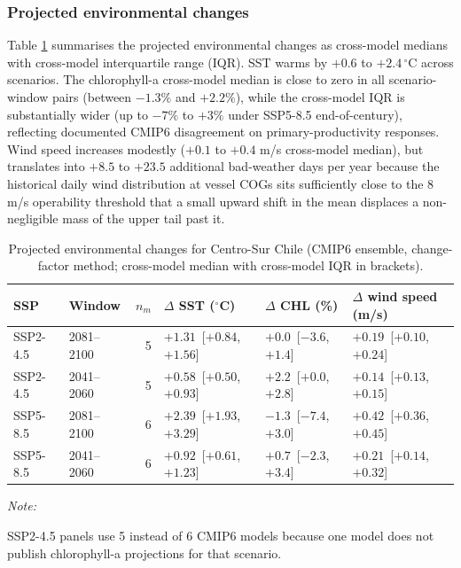\documentclass[
  11pt,
]{article}
\begin{document}
\subsubsection{Projected environmental changes}\label{projected-environmental-changes}

Table \ref{tab:env_projections} summarises the projected environmental changes as cross-model medians with cross-model interquartile range (IQR). SST warms by \(+0.6\) to \(+2.4\,^{\circ}\)C across scenarios. The chlorophyll-a cross-model median is close to zero in all scenario-window pairs (between \(-1.3\%\) and \(+2.2\%\)), while the cross-model IQR is substantially wider (up to \(-7\%\) to \(+3\%\) under SSP5-8.5 end-of-century), reflecting documented CMIP6 disagreement on primary-productivity responses. Wind speed increases modestly (\(+0.1\) to \(+0.4\) m/s cross-model median), but translates into \(+8.5\) to \(+23.5\) additional bad-weather days per year because the historical daily wind distribution at vessel COGs sits sufficiently close to the 8 m/s operability threshold that a small upward shift in the mean displaces a non-negligible mass of the upper tail past it.

\begin{table}[!h]
\centering
\caption{\label{tab:envprojections}Projected environmental changes for Centro-Sur Chile (CMIP6 ensemble, change-factor method; cross-model median with cross-model IQR in brackets). \label{tab:env_projections}}
\centering
\begin{threeparttable}
\fontsize{9}{11}\selectfont
\begin{tabular}[t]{llrlll}
\toprule
SSP & Window & $n_m$ & $\Delta$ SST ($^{\circ}$C) & $\Delta$ CHL (\%) & $\Delta$ wind speed (m/s)\\
\midrule
SSP2-4.5 & 2081--2100 & 5 & $+1.31$ \,[$+0.84$, $+1.56$] & $+0.0$ \,[$-3.6$, $+1.4$] & $+0.19$ \,[$+0.10$, $+0.24$]\\
SSP2-4.5 & 2041--2060 & 5 & $+0.58$ \,[$+0.50$, $+0.93$] & $+2.2$ \,[$+0.0$, $+2.8$] & $+0.14$ \,[$+0.13$, $+0.15$]\\
SSP5-8.5 & 2081--2100 & 6 & $+2.39$ \,[$+1.93$, $+3.29$] & $-1.3$ \,[$-7.4$, $+3.0$] & $+0.42$ \,[$+0.36$, $+0.45$]\\
SSP5-8.5 & 2041--2060 & 6 & $+0.92$ \,[$+0.61$, $+1.23$] & $+0.7$ \,[$-2.3$, $+3.4$] & $+0.21$ \,[$+0.14$, $+0.32$]\\
\bottomrule
\end{tabular}
\begin{tablenotes}
\item \textit{Note:} 
\item SSP2-4.5 panels use 5 instead of 6 CMIP6 models because one model does not publish chlorophyll-a projections for that scenario.
\end{tablenotes}
\end{threeparttable}
\end{table}
\end{document}
